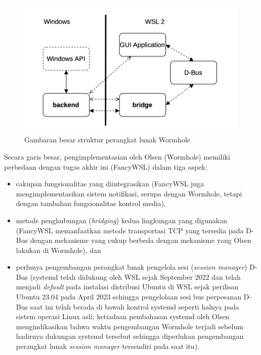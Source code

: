 \begin{figure}
    \centering
    \includegraphics[width=0.75\linewidth]{assets/Screenshot 2024-01-14 at 13.31.38.png}
    \caption{Gambaran besar struktur perangkat lunak Wormhole \cite{olsen-2022-through-the-wormhole}}
    \label{olsen-wormhole-processes-basic-structure}
\end{figure}

Secara garis besar, pengimplementasian oleh Olsen (Wormhole) memiliki perbedaan dengan tugas akhir ini (FancyWSL) dalam tiga aspek:
\begin{itemize}
    \item cakupan fungsionalitas yang diintegrasikan (FancyWSL juga mengimplementasikan sistem notifikasi, serupa dengan Wormhole, tetapi dengan tambahan fungsionalitas kontrol media),
    \item metode penghubungan (\textit{bridging}) kedua lingkungan yang digunakan (FancyWSL memanfaatkan metode transportasi TCP yang tersedia pada D-Bus dengan mekanisme yang cukup berbeda dengan mekanisme yang Olsen lakukan di Wormhole), dan
    \item perlunya pengembangan perangkat lunak pengelola sesi (\textit{session manager}) D-Bus (systemd telah didukung oleh WSL sejak September 2022 \cite{systemd-support-is-now-available-in-wsl} dan telah menjadi \textit{default} pada instalasi distribusi Ubuntu di WSL sejak perilisan Ubuntu 23.04 pada April 2023 \cite{ubuntu-2304-release-roundup-systemd-now-becomes-default-for-ubuntu-on-wsl} sehingga pengelolaan sesi bus perpesanan D-Bus saat ini telah berada di bawah kontrol systemd seperti halnya pada sistem operasi Linux asli; ketiadaan pembahasan systemd oleh Olsen mengindikasikan bahwa waktu pengembangan Wormhole terjadi sebelum hadirnya dukungan systemd tersebut sehingga diperlukan pengembangan perangkat lunak \textit{session manager} tersendiri pada saat itu).
\end{itemize}

